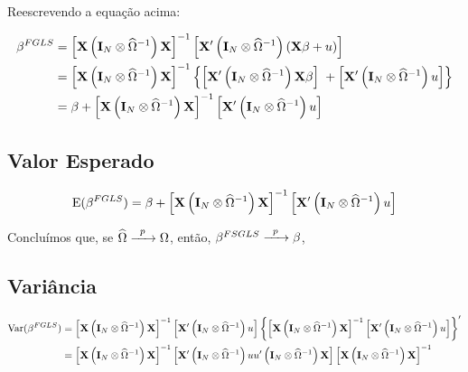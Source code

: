 \documentclass[11pt, oneside, a4paper, article]{article}
\numberwithin{equation}{section}
\begin{document}
\begin{description}
	Reescrevendo a equação acima:

	\vspace{-1.5 em}
	\begin{align*}
		\beta^{FGLS}
		&= 
		\left[  \mathbf{X} \left( \mathbf{I}_{N} \otimes \widehat{\Omega}^{-1} \right) \mathbf{X} \right]^{-1}
		\left[  \mathbf{X}' \left( \mathbf{I}_{N} \otimes \widehat{\Omega}^{-1} \right) (\mathbf{X} \beta + u) \right]
		\\
		&= 
		\left[ \mathbf{X} \left( \mathbf{I}_{N} \otimes \widehat{\Omega}^{-1} \right) \mathbf{X} \right]^{-1}
		\left\{ 
			\left[ \mathbf{X}' \left( \mathbf{I}_{N} \otimes \widehat{\Omega}^{-1} \right) \mathbf{X} \beta \right]
			\; +
			\left[ \mathbf{X}' \left( \mathbf{I}_{N} \otimes \widehat{\Omega}^{-1} \right) u \right]
		\right\}
		\\
		&= 
		\beta +
		\left[ \mathbf{X} \left( \mathbf{I}_{N} \otimes \widehat{\Omega}^{-1} \right) \mathbf{X} \right]^{-1}
		\left[ \mathbf{X}' \left( \mathbf{I}_{N} \otimes \widehat{\Omega}^{-1} \right) u \right]
	\end{align*}

	\subsection{Valor Esperado}

	\vspace{-1 em}
	\begin{align*}
		\text{E}(\beta^{FGLS})
		= 
		\beta +
		\left[ \mathbf{X} \left( \mathbf{I}_{N} \otimes \widehat{\Omega}^{-1} \right) \mathbf{X} \right]^{-1}
		\left[ \mathbf{X}' \left( \mathbf{I}_{N} \otimes \widehat{\Omega}^{-1} \right) u \right]
	\end{align*}

	Concluímos que, se 
	$\widehat{\Omega} \xrightarrow{\enskip p \enskip} \Omega$,
	então,
	$\beta^{FSGLS} \xrightarrow{\enskip p \enskip} \beta$,

	\subsection{Variância}

	\vspace{-1 em}
	\begin{align*}
		\text{Var}(\beta^{FGLS})
		&= 
		\left[ \mathbf{X} \left( \mathbf{I}_{N} \otimes \widehat{\Omega}^{-1} \right) \mathbf{X} \right]^{-1}
		\left[ \mathbf{X}' \left( \mathbf{I}_{N} \otimes \widehat{\Omega}^{-1} \right) u \right]
		\left\{ 
			\left[ \mathbf{X} \left( \mathbf{I}_{N} \otimes \widehat{\Omega}^{-1} \right) \mathbf{X} \right]^{-1}
			\left[ \mathbf{X}' \left( \mathbf{I}_{N} \otimes \widehat{\Omega}^{-1} \right) u \right]
		\right\}^{\prime}
		\\
		&=
		\left[ \mathbf{X} \left( \mathbf{I}_{N} \otimes \widehat{\Omega}^{-1} \right) \mathbf{X} \right]^{-1}
		\left[
			\mathbf{X}' \left( \mathbf{I}_{N} \otimes \widehat{\Omega}^{-1} \right) 
			u u'
			\left( \mathbf{I}_{N} \otimes \widehat{\Omega}^{-1} \right) \mathbf{X}
		\right]
		\left[ \mathbf{X} \left( \mathbf{I}_{N} \otimes \widehat{\Omega}^{-1} \right) \mathbf{X} \right]^{-1}
	\end{align*}


\end{description}
\end{document}
